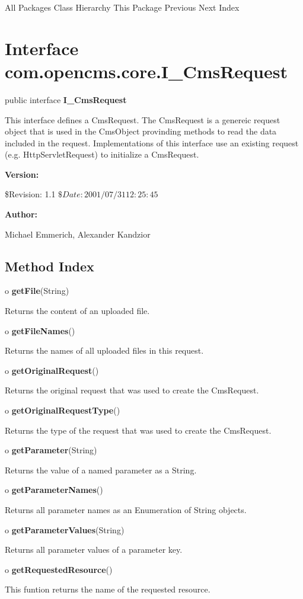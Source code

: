 \begin{PRE}
All Packages  Class Hierarchy  This Package  Previous  Next  Index
\end{PRE}

\htmlHR

\section{  Interface com.opencms.core.I\_CmsRequest }

\begin{description}
\item public interface {\bf I\_CmsRequest} 
\end{description}

This interface defines a CmsRequest. The CmsRequest is a genereic request
object that is used in the CmsObject provinding methods to read the data
included in the request. Implementations of this interface use an existing
request (e.g. HttpServletRequest) to initialize a CmsRequest. 

\begin{description}
\item {\bf Version:}  

\$Revision: 1.1 $ \$Date: 2001/07/31 12:25:45 $  
\item {\bf Author:}  

Michael Emmerich, Alexander Kandzior 
\end{description}

\htmlHR

\subsection*{  Method Index }

\begin{description}
\item o {\bf getFile}(String)  

Returns the content of an uploaded file.  
\item o {\bf getFileNames}()  

Returns the names of all uploaded files in this request.  
\item o {\bf getOriginalRequest}()  

Returns the original request that was used to create the CmsRequest.  
\item o {\bf getOriginalRequestType}()  

Returns the type of the request that was used to create the CmsRequest.  
\item o {\bf getParameter}(String)  

Returns the value of a named parameter as a String.  
\item o {\bf getParameterNames}()  

Returns all parameter names as an Enumeration of String objects.  
\item o {\bf getParameterValues}(String)  

Returns all parameter values of a parameter key.  
\item o {\bf getRequestedResource}()  

This funtion returns the name of the requested resource. 
\end{description}

